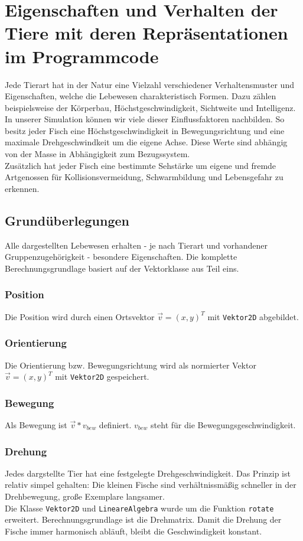 \documentclass[11pt]{article}
\begin{document}
\section{Eigenschaften und Verhalten der Tiere mit deren Repräsentationen im Programmcode}
Jede Tierart hat in der Natur eine Vielzahl verschiedener Verhaltensmuster und Eigenschaften, welche die Lebewesen charakteristisch Formen. Dazu zählen beispielsweise der Körperbau, Höchstgeschwindigkeit, Sichtweite und Intelligenz. In unserer Simulation können wir viele dieser Einflussfaktoren nachbilden.
So besitz jeder Fisch eine Höchstgeschwindigkeit in Bewegungsrichtung und eine maximale Drehgeschwindkeit um die eigene Achse. Diese Werte sind abhängig von der Masse in Abhängigkeit zum Bezugssystem.\\
Zusätzlich hat jeder Fisch eine bestimmte Sehstärke um eigene und fremde Artgenossen für Kollisionsvermeidung, Schwarmbildung und Lebensgefahr zu erkennen.
\subsection{Grundüberlegungen}
Alle dargestellten Lebewesen erhalten - je nach Tierart und vorhandener Gruppenzugehörigkeit - besondere Eigenschaften. Die komplette Berechnungsgrundlage basiert auf der Vektorklasse aus Teil eins.
\subsubsection{Position}
Die Position wird durch einen Ortsvektor \( \vec{v}=(x,y)^T \) mit \lstinline{Vektor2D} abgebildet.
\subsubsection{Orientierung}
Die Orientierung bzw. Bewegungsrichtung wird als normierter Vektor \( \vec{v}=(x,y)^T \) mit \lstinline{Vektor2D} gespeichert.
\subsubsection{Bewegung}
Als Bewegung ist \( \vec{v}* v_{bew} \) definiert. \( v_{bew} \) steht für die Bewegungsgeschwindigkeit.
\subsubsection{Drehung}
Jedes dargstellte Tier hat eine festgelegte Drehgeschwindigkeit. Das Prinzip ist relativ simpel gehalten: Die kleinen Fische sind verhältnissmäßig schneller in der Drehbewegung, große Exemplare langsamer.\\
Die Klasse \lstinline{Vektor2D} und \lstinline{LineareAlgebra} wurde um die Funktion \lstinline{rotate} erweitert. Berechnungsgrundlage ist die Drehmatrix. Damit die Drehung der Fische immer harmonisch abläuft, bleibt die Geschwindigkeit konstant.
\end{document}
